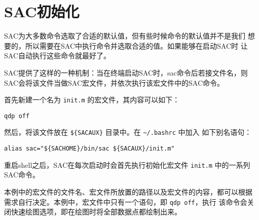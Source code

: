 \section{SAC初始化}
\label{sec:init-macro}
SAC为大多数命令选取了合适的默认值，但有些时候命令的默认值并不是我们
想要的，所以需要在SAC中执行命令并选取合适的值。如果能够在启动SAC时
让SAC自动执行这些命令就最好了。

SAC提供了这样的一种机制：当在终端启动SAC时，sac命令后若接文件名，则
SAC会将该文件当做SAC宏文件，并依次执行该宏文件中的SAC命令。

首先新建一个名为 \texttt{init.m} 的宏文件，其内容可以如下：
\begin{verbatim}
qdp off
\end{verbatim}

然后，将该文件放在 \verb|${SACAUX}| 目录中。在 \verb|~/.bashrc| 中加入
如下别名语句：
\begin{verbatim}
alias sac="${SACHOME}/bin/sac ${SACAUX}/init.m"
\end{verbatim}

重启shell之后，SAC在每次启动时会首先执行初始化宏文件 \texttt{init.m}
中的一系列SAC命令。

本例中的宏文件的文件名、宏文件所放置的路径以及宏文件的内容，都可以根据
需求自行决定。本例中，宏文件中只有一个语句，即 \texttt{qdp off}，执行
该命令会关闭快速绘图选项，即在绘图时将全部数据点都绘制出来。
